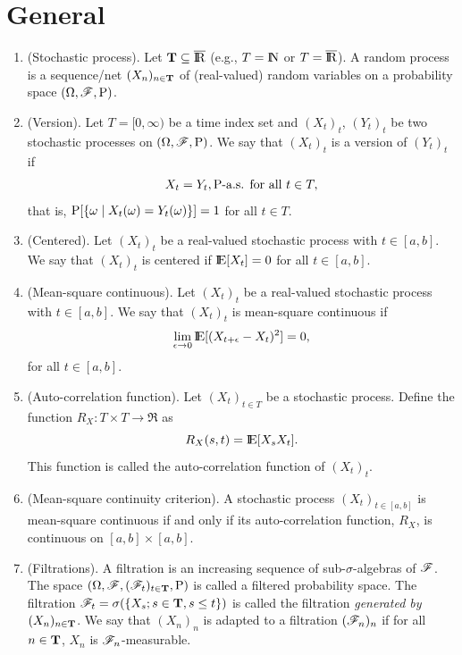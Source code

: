 \documentclass[a4paper,10pt]{scrbook}
\begin{document}
\section{General}\label{sec:stoch-proc-general}
\begin{enumerate}
 \item (Stochastic process). Let $\T \subseteq \barre$ (e.g., $T=\N$ or $T=\barre$). A random process is 
       a sequence/net $(X_n)_{n\in \mathbf{T}}$ of (real-valued) random variables on a probability space $(\Omega,\mathscr{F},\mathrm{P})$.

 \item (Version). Let \(T=[0,\infty)\) be a time index set and \((X_t)_t\), \((Y_t)_t\) be two stochastic processes 
                  on \((\Omega,\mathscr{F},\mathrm{P})\). We say that  \((X_t)_t\) is a version of \((Y_t)_t\)  if 
                  \[
                   X_t = Y_t, \mathrm{P}{\text{-a.s. for all }} t\in T,
                  \]
                  that is, \(\mathrm{P}[\{\omega \mid X_t(\omega) = Y_t(\omega)\}] = 1\) for all \(t\in T\).

                  
 \item (Centered). Let \((X_t)_t\) be a real-valued stochastic process with \(t\in[a,b]\).
       We say that \((X_t)_t\) is centered if \(\E[X_t]=0\) for all \(t\in[a,b]\).
       
 \item (Mean-square continuous). Let \((X_t)_t\) be a real-valued stochastic process with \(t\in[a,b]\).
       We say that \((X_t)_t\) is mean-square continuous if 
       \[
        \lim_{\epsilon \to 0}\E[(X_{t+\epsilon}-X_t)^2]=0,
       \]
       for all \(t\in[a,b]\).

 \item (Auto-correlation function). Let \((X_t)_{t\in T}\) be a stochastic process. Define 
       the function \(R_X:T\times T\to \Re\) as 
       \[
        R_X(s,t) = \E[X_s X_t].
       \]
       This function is called the auto-correlation function of \((X_t)_t\).
       
 \item (Mean-square continuity criterion). A stochastic process \((X_t)_{t\in[a,b]}\) is
       mean-square continuous if and only if its auto-correlation function, \(R_X\), is 
       continuous on \([a,b]\times [a,b]\).
       
 \item (Filtrations). A filtration is an increasing sequence of sub-$\sigma$-algebras of $\mathscr{F}$. The space 
       $(\Omega, \mathscr{F}, (\mathscr{F}_t)_{t\in \mathbf{T}}, \mathrm{P})$ is called a filtered probability space. The filtration 
       $\mathscr{F}_t = \sigma(\{X_s; s\in \mathbf{T}, s\leq t\})$ is called the filtration \textit{generated by $(X_n)_{n\in \mathbf{T}}$}.
       We say that $(X_n)_n$ is adapted to a filtration $(\mathscr{F}_n)_n$ if for all $n\in \mathbf{T}$, $X_n$ is $\mathscr{F}_n$-measurable.
       

\end{enumerate}
\end{document}
